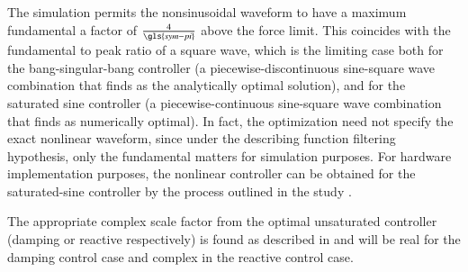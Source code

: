 The simulation permits the nonsinusoidal waveform to have a maximum fundamental a factor of $\frac{4}{\gls{sym-pi}}$ above the force limit.
This coincides with the fundamental to peak ratio of a square wave, which is the limiting case both for the bang-singular-bang controller (a piecewise-discontinuous sine-square wave combination that \citet{hendrikx_optimal_2017} finds as the analytically optimal solution), and for the saturated sine controller (a piecewise-continuous sine-square wave combination that \citet{coe_initial_2020} finds as numerically optimal).
In fact, the optimization need not specify the exact nonlinear waveform, since under the describing function filtering hypothesis, only the fundamental matters for simulation purposes.
For hardware implementation purposes, the nonlinear controller can be obtained for the saturated-sine controller by the process outlined in the study \cite{mccabe_force-limited_2024}.

The appropriate complex scale factor from the optimal unsaturated controller (damping or reactive respectively) is found as described in  and will be real for the damping control case and complex in the reactive control case.



